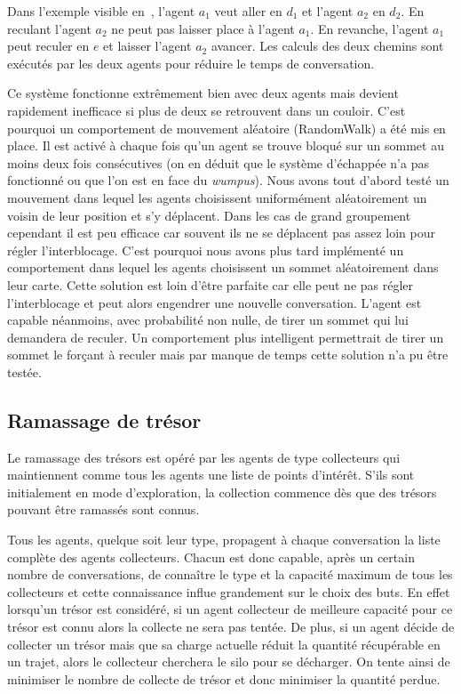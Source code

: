 \documentclass[11pt]{article}
\begin{document}
Dans l'exemple visible en~, l'agent $a_1$ veut aller en $d_1$ et l'agent $a_2$ en $d_2$. En reculant l'agent $a_2$ ne peut pas laisser place à l'agent $a_1$. En revanche, l'agent $a_1$ peut reculer en $e$ et laisser l'agent $a_2$ avancer. Les calculs des deux chemins sont exécutés par les deux agents pour réduire le temps de conversation.

Ce système fonctionne extrêmement bien avec deux agents mais devient rapidement inefficace si plus de deux se retrouvent dans un couloir. C'est pourquoi un comportement de mouvement aléatoire (\textsf{RandomWalk}) a été mis en place. Il est activé à chaque fois qu'un agent se trouve bloqué sur un sommet au moins deux fois consécutives (on en déduit que le système d'échappée n'a pas fonctionné ou que l'on est en face du \textit{wumpus}). Nous avons tout d'abord testé un mouvement dans lequel les agents choisissent uniformément aléatoirement un voisin de leur position et s'y déplacent. Dans les cas de grand groupement cependant il est peu efficace car souvent ils ne se déplacent pas assez loin pour régler l'interblocage. C'est pourquoi nous avons plus tard implémenté un comportement  dans lequel les agents choisissent un sommet aléatoirement dans leur carte. Cette solution est loin d'être parfaite car elle peut ne pas régler l'interblocage et peut alors engendrer une nouvelle conversation. L'agent est capable néanmoins, avec probabilité non nulle, de tirer un sommet qui lui demandera de reculer. Un comportement plus intelligent permettrait de tirer un sommet le forçant à reculer mais par manque de temps cette solution n'a pu être testée.

\subsection{Ramassage de trésor}

Le ramassage des trésors est opéré par les agents de type collecteurs qui maintiennent comme tous les agents une liste de points d'intérêt. S'ils sont initialement en mode d'exploration, la collection commence dès que des trésors pouvant être ramassés sont connus.

Tous les agents, quelque soit leur type, propagent à chaque conversation la liste complète des agents collecteurs. Chacun est donc capable, après un certain nombre de conversations, de connaître le type et la capacité maximum de tous les collecteurs et cette connaissance influe grandement sur le choix des buts. En effet lorsqu'un trésor est considéré, si un agent collecteur de meilleure capacité pour ce trésor est connu alors la collecte ne sera pas tentée. De plus, si un agent décide de collecter un trésor mais que sa charge actuelle réduit la quantité récupérable en un trajet, alors le collecteur cherchera le silo pour se décharger. On tente ainsi de minimiser le nombre de collecte de trésor et donc minimiser la quantité perdue.
\end{document}
